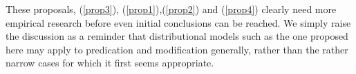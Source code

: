 \documentclass[10pt,letterpaper,twocolumn]{article}
\begin{document}
These proposals, (\ref{prop3}), (\ref{prop1}),(\ref{prop2}) and (\ref{prop4}) clearly need more empirical research before even initial conclusions can be reached. We simply raise the discussion as a reminder that distributional models such as the one proposed here may apply to predication and modification generally, rather than the rather narrow cases for which it first seems appropriate.










\end{document}
